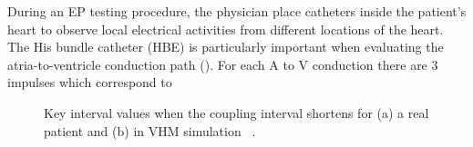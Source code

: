 During an EP testing procedure, the physician place catheters inside the patient's heart to observe local electrical activities from different locations of the heart. The His bundle catheter (HBE) is particularly important when evaluating the atria-to-ventricle conduction path (). For each A to V conduction there are 3 impulses which correspond to 
\begin{figure}[!t]
\centering
\label{fig:Case_1}
\caption{\small Key interval values when the coupling interval shortens for (a) a real patient and (b) in VHM simulation ~\cite{vhm_ecrts10}.}
\end{figure} 



